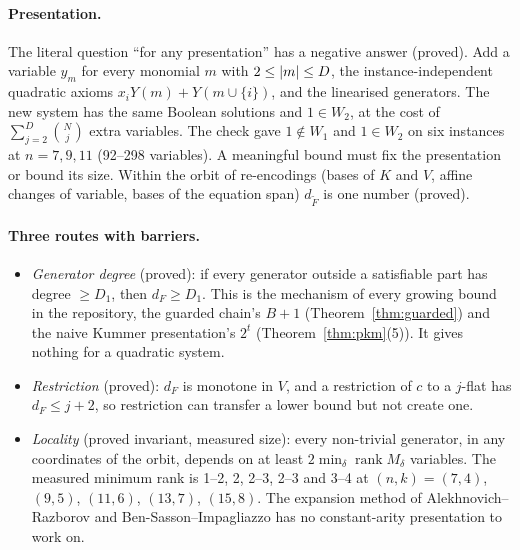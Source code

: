 \paragraph{Presentation.} The literal question ``for any presentation'' has
a negative answer (proved). Add a variable $y_m$ for every monomial $m$ with
$2\le\lvert m \rvert\le D$, the instance-independent quadratic axioms
$x_iY(m)+Y(m\cup\{i\})$, and the linearised generators. The new system has
the same Boolean solutions and $1\in W_2$, at the cost of
$\sum_{j=2}^{D}\binom Nj$ extra variables. The check gave $1\notin W_1$ and
$1\in W_2$ on six instances at $n=7,9,11$ (92--298 variables). A meaningful
bound must fix the presentation or bound its size. Within the orbit of
re-encodings (bases of $K$ and $V$, affine changes of variable, bases of the
equation span) $d_{\tilde F}$ is one number (proved).

\paragraph{Three routes with barriers.}
\begin{itemize}
\item \emph{Generator degree} (proved): if every generator outside a
  satisfiable part has degree $\ge D_1$, then $d_F\ge D_1$. This is the
  mechanism of every growing bound in the repository, the guarded chain's
  $B+1$ (Theorem~\ref{thm:guarded}) and the naive Kummer presentation's
  $2^t$ (Theorem~\ref{thm:pkm}(5)). It gives nothing for a quadratic system.
\item \emph{Restriction} (proved): $d_F$ is monotone in $V$, and a
  restriction of $c$ to a $j$-flat has $d_F\le j+2$, so restriction can
  transfer a lower bound but not create one.
\item \emph{Locality} (proved invariant, measured size): every non-trivial
  generator, in any coordinates of the orbit, depends on at least
  $2\min_\delta\operatorname{rank}M_\delta$ variables. The measured minimum
  rank is 1--2, 2, 2--3, 2--3 and 3--4 at $(n,k)=(7,4)$, $(9,5)$, $(11,6)$,
  $(13,7)$, $(15,8)$. The expansion method of Alekhnovich--Razborov and
  Ben-Sasson--Impagliazzo has no constant-arity presentation to work on.
\end{itemize}

